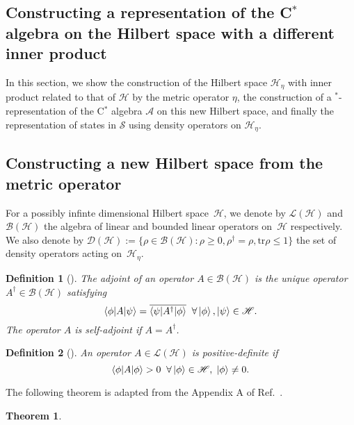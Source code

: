 \documentclass[amsmath,amssymb,aps,pra,superscriptaddress,twocolumn]{revtex4-2}
\newtheorem{definition}{Definition}
\newtheorem{theorem}{Theorem}
\begin{document}
\begin{appendix}

\section{Constructing a representation of the C\texorpdfstring{$^{*}$}{*} algebra on the Hilbert space with a different inner product}\label{sec:newHilbertspace}
In this section, we show the construction of the Hilbert space $\mathscr{H}_\eta$ with inner product related 
to that of $\mathscr{H}$ by the metric
operator $\eta$,
the construction of a ${}^*$-representation of the C$^{*}$ algebra $\mathcal{A}$ on this new Hilbert space, 
and
finally the representation of states in $\mathcal{S}$ using density operators on $\mathscr{H}_\eta$.


\subsection{Constructing a new Hilbert space from the metric operator}
For a possibly infinte dimensional Hilbert space~$\mathscr{H}$, we denote by $\mathcal{L}(\mathscr{H})$ and $\mathcal{B}(\mathscr{H})$ the algebra of 
linear and bounded linear operators on~$\mathscr{H}$ respectively. We also denote by $\mathcal{D}\left(\mathscr{H}\right) := 
\{\rho \in \mathcal{B}(\mathscr{H}) : \rho \ge 0, \rho^\dagger = \rho, \text{tr}\rho\le 1 \}$ the set 
of density operators acting on~$\mathscr{H}_\eta$. 
\begin{definition}[\cite{Con07}]
The adjoint of an operator $A \in \mathcal{B}(\mathscr{H})$ is the unique operator $A^\dagger\in \mathcal{B}(\mathscr{H})$ satisfying
\begin{equation}
    \braket{\phi|A|\psi} = \overline{\braket{\psi|A^\dagger|\phi}} \;\; \forall \ket{\phi},\ket{\psi} \in \mathscr{H}.
\end{equation} 
The operator $A$ is self-adjoint if $A = A^\dagger$.
\end{definition}
\begin{definition}[\cite{Con07}]
An operator $A \in \mathcal{L}(\mathscr{H})$ is positive-definite if 
\begin{equation}
    \braket{\phi|A|\phi} >0  \;\; \forall \ket{\phi} \in \mathscr{H},\;\ket{\phi} \ne 0.
\end{equation} 
\end{definition}
The following theorem is adapted from the Appendix A of Ref.~\cite{SGH92}.
\begin{theorem}
\label{thm:Heta}

\end{theorem}
\end{appendix}
\end{document}
